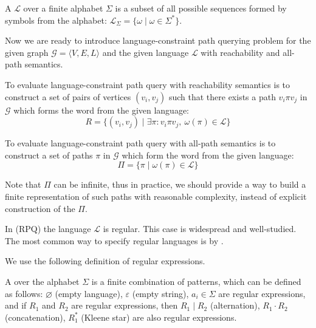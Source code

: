 \begin{definition}
A  $\mathcal{L}$ over a finite alphabet $\Sigma$ is a subset of all possible sequences formed by symbols from the alphabet: $\mathcal{L}_{\Sigma} = \{\omega \mid \omega \in \Sigma^*\}$.
\end{definition}

Now we are ready to introduce language-constraint path querying problem for the given graph  $\mathcal{G} = \langle V,E,L \rangle$ and the given language $\mathcal{L}$ with reachability and all-path semantics.

\begin{definition}
To evaluate language-constraint path query with reachability semantics is to construct a set of pairs of vertices $(v_i,v_j)$ such that there exists a path $v_i \pi v_j$ in $\mathcal{G}$ which forms the word from the given language:
$$
R = \{(v_i,v_j) \mid \exists \pi: v_i \pi v_j, \ \omega(\pi) \in \mathcal{L} \}
$$
\end{definition}

\begin{definition}
To evaluate language-constraint path query with all-path semantics is to construct a set of paths $\pi$ in $\mathcal{G}$ which form the word from the given language:
$$
\Pi = \{ \pi \mid \omega(\pi) \in \mathcal{L}\}
$$
\end{definition}

Note that $\Pi$ can be infinite, thus in practice, we should provide a way to build a finite representation of such paths with reasonable complexity, instead of explicit construction of the $\Pi$.


In  (RPQ) the language $\mathcal{L}$ is regular.
This case is widespread and well-studied.
The most common way to specify regular languages is by .

We use the following definition of regular expressions.
\begin{definition}
A  over the alphabet $\Sigma$ is a finite combination of patterns, which can be defined as follows: $\varnothing$ (empty language), $\varepsilon$ (empty string), $a_i \in \Sigma$ are regular expressions, and if $R_1$ and $R_2$ are regular expressions, then $R_1 \mid R_2$ (alternation), $R_1 \cdot R_2$ (concatenation), $R_1^*$ (Kleene star) are also regular expressions.
\end{definition}

